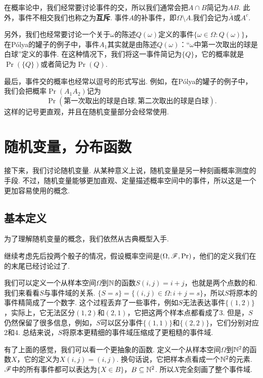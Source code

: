 \begin{remark}
    在概率论中，我们经常要讨论事件的交，所以我们通常会把$A\cap B$简记为$AB$. 此外，事件不相交我们也称之为\textbf{互斥}. 事件$A$的补事件，即$\Omega\setminus A$.我们会记为$\bar{A}$或$A^c$.
    
    另外，我们也经常要讨论一个关于$\omega$的陈述$Q(\omega)$定义的事件$\{\omega\in\Omega:Q(\omega)\}$，在P\'olya的罐子的例子中，事件$A_1$其实就是由陈述$Q(\omega)$：“$\omega$中第一次取出的球是白球”定义的事件. 在这种情况下，我们将这一事件简记为$\{Q\}$，它的概率就是$\Pr(\{Q\})$或者简记为$\Pr(Q)$. 
    
    最后，事件交的概率也经常以逗号的形式写出. 例如，在P\'olya的罐子的例子中，我们会把概率$\Pr(A_1A_2)$记为
    \[\Pr(\text{第一次取出的球是白球},\text{第二次取出的球是白球}).\] 
    这样的记号更直观，并且在随机变量部分会经常使用. 
\end{remark}

\section{随机变量，分布函数}\label{sec:random-variable}

接下来，我们讨论随机变量. 从某种意义上说，随机变量是另一种刻画概率测度的手段. 不过，随机变量能够更加直观、定量描述概率空间中的事件，所以这是一个更加容易使用的概念. 

\subsection{基本定义}

为了理解随机变量的概念，我们依然从古典概型入手. 

\begin{example}\label{example:random-variable}
继续考虑先后投两个骰子的情况，假设概率空间是$(\Omega,\mathscr{F},\Pr)$，他们的定义我们在 的末尾已经讨论过了. 

我们可以定义一个从样本空间$\Omega$到$\mathbb{N}$的函数$S(i,j)=i+j$，也就是两个点数的和. 我们来看看$S$与事件域的关系. $\{S=s\}=\{(i,j)\in\Omega:i+j=s\}$，所以$S$将原本的事件精简成了一个数字. 这个过程丢弃了一些事件，例如$S$无法表达事件$\{(1,2)\}$，实际上，它无法区分$(1,2)$和$(2,1)$，它把这两个样本点都看成了$3$. 但是，$S$仍然保留了很多信息，例如，$S$可以区分事件$\{(1,1)\}$和$\{(2,2)\}$，它们分别对应$2$和$4$. 总结来说，$S$将原本更精细的事件域压缩成了更粗糙的事件域. 

有了上面的感觉，我们可以看一个更抽象的函数. 定义一个从样本空间$\Omega$到$\mathbb{N}^2$的函数$X$，它的定义为$X(i,j) = (i,j)$. 换句话说，它把样本点看成一个$\mathbb{N}^2$的元素. $\mathscr{F}$中的所有事件都可以表达为$\{X\in B\}$，$B\subseteq\mathbb{N}^2$. 所以$X$完全刻画了整个事件域. 
\end{example}

